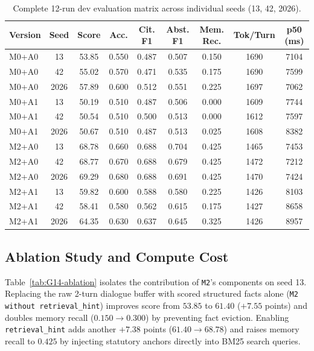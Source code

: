 \documentclass[11pt]{article}
\newcommand{\groupid}{G14}
\begin{document}
\begin{table}[h]
\centering\small
\caption{Complete 12-run dev evaluation matrix across individual seeds (13, 42, 2026).}
\label{tab:\groupid-seeds}
\begin{tabular}{lcccccccc}
\toprule
Version & Seed & Score & Acc. & Cit. F1 & Abst. F1 & Mem. Rec. & Tok/Turn & p50 (ms) \\
\midrule
M0+A0 & 13 & 53.85 & 0.550 & 0.487 & 0.507 & 0.150 & 1690 & 7104 \\
M0+A0 & 42 & 55.02 & 0.570 & 0.471 & 0.535 & 0.175 & 1690 & 7599 \\
M0+A0 & 2026 & 57.89 & 0.600 & 0.512 & 0.551 & 0.225 & 1697 & 7062 \\
M0+A1 & 13 & 50.19 & 0.510 & 0.487 & 0.506 & 0.000 & 1609 & 7744 \\
M0+A1 & 42 & 50.54 & 0.510 & 0.500 & 0.513 & 0.000 & 1612 & 7597 \\
M0+A1 & 2026 & 50.67 & 0.510 & 0.487 & 0.513 & 0.025 & 1608 & 8382 \\
M2+A0 & 13 & 68.78 & 0.660 & 0.688 & 0.704 & 0.425 & 1465 & 7453 \\
M2+A0 & 42 & 68.77 & 0.670 & 0.688 & 0.679 & 0.425 & 1472 & 7212 \\
M2+A0 & 2026 & 69.29 & 0.680 & 0.688 & 0.691 & 0.425 & 1470 & 7424 \\
M2+A1 & 13 & 59.82 & 0.600 & 0.588 & 0.580 & 0.225 & 1426 & 8103 \\
M2+A1 & 42 & 58.41 & 0.580 & 0.562 & 0.615 & 0.175 & 1427 & 8658 \\
M2+A1 & 2026 & 64.35 & 0.630 & 0.637 & 0.645 & 0.325 & 1426 & 8957 \\
\bottomrule
\end{tabular}
\end{table}

\subsection{Ablation Study and Compute Cost}
Table~\ref{tab:\groupid-ablation} isolates the contribution of \texttt{M2}'s components on seed 13. Replacing the raw 2-turn dialogue buffer with scored structured facts alone (\texttt{M2 without retrieval\_hint}) improves score from $53.85$ to $61.40$ ($+7.55$ points) and doubles memory recall ($0.150 \rightarrow 0.300$) by preventing fact eviction. Enabling \texttt{retrieval\_hint} adds another $+7.38$ points ($61.40 \rightarrow 68.78$) and raises memory recall to $0.425$ by injecting statutory anchors directly into BM25 search queries.
\end{document}
